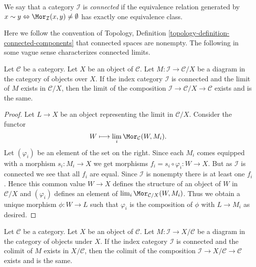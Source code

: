 \begin{definition}
\label{definition-category-connected}
We say that a category $\mathcal{I}$ is {\it connected}
if the equivalence relation generated by
$x \sim y \Leftrightarrow \Mor_\mathcal{I}(x, y) \not = \emptyset$
has exactly one equivalence class.
\end{definition}

\noindent
Here we follow the convention of
Topology, Definition \ref{topology-definition-connected-components}
that connected spaces are nonempty.
The following in some vague sense characterizes connected limits.

\begin{lemma}
\label{lemma-connected-limit-over-X}
Let $\mathcal{C}$ be a category.
Let $X$ be an object of $\mathcal{C}$.
Let $M : \mathcal{I} \to \mathcal{C}/X$ be a diagram
in the category of objects over $X$.
If the index category $\mathcal{I}$ is connected
and the limit of $M$ exists in $\mathcal{C}/X$,
then the limit of the composition
$\mathcal{I} \to \mathcal{C}/X \to \mathcal{C}$
exists and is the same.
\end{lemma}

\begin{proof}
Let $L \to X$ be an object representing the limit in $\mathcal{C}/X$.
Consider the functor
$$
W \longmapsto \lim_i \Mor_\mathcal{C}(W, M_i).
$$
Let $(\varphi_i)$ be an element of the set on the right.
Since each $M_i$ comes equipped with a morphism $s_i : M_i \to X$ we
get morphisms $f_i = s_i \circ \varphi_i : W \to X$. But as $\mathcal{I}$
is connected we see that all $f_i$ are equal. Since $\mathcal{I}$
is nonempty there is at least one $f_i$.
Hence this common value $W \to X$ defines the structure of an
object of $W$ in $\mathcal{C}/X$ and $(\varphi_i)$ defines an
element of $\lim_i \Mor_{\mathcal{C}/X}(W, M_i)$.
Thus we obtain a unique morphism $\phi : W \to L$ such that
$\varphi_i$ is the composition of $\phi$ with $L \to M_i$ as desired.
\end{proof}

\begin{lemma}
\label{lemma-connected-colimit-under-X}
Let $\mathcal{C}$ be a category.
Let $X$ be an object of $\mathcal{C}$.
Let $M : \mathcal{I} \to X/\mathcal{C}$ be a diagram
in the category of objects under $X$.
If the index category $\mathcal{I}$ is connected
and the colimit of $M$ exists in $X/\mathcal{C}$,
then the colimit of the composition
$\mathcal{I} \to X/\mathcal{C} \to \mathcal{C}$
exists and is the same.
\end{lemma}

